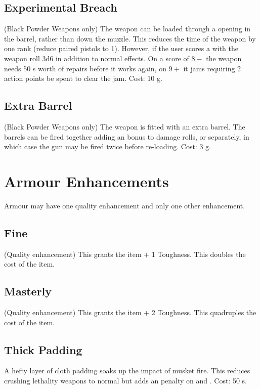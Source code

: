 \subsection{Experimental Breach}
(Black Powder Weapons only) The weapon can be loaded through a opening in the barrel, rather than down the muzzle. This reduces the  time of the weapon by one rank (reduce paired pistols to  1). However, if the user scores a  with the weapon roll 3d6 in addition to normal  effects. On a score of $8-$ the weapon needs 50 s worth of repairs before it works again, on $9+$ it jams requiring 2 action points be spent to clear the jam. Cost: 10 g.

\subsection{Extra Barrel}
(Black Powder Weapons only) The weapon is fitted with an extra barrel. The barrels can be fired together adding an  bonus to damage rolls, or separately, in which case the gun may be fired twice before re-loading. Cost: 3 g.




\section{Armour Enhancements}
Armour may have one quality enhancement and only one other enhancement.

\subsection{Fine}
(Quality enhancement) This grants the item + 1 Toughness. This doubles the cost of the item.

\subsection{Masterly}
(Quality enhancement) This grants the item + 2 Toughness. This quadruples the cost of the item.

\subsection{Thick Padding}
A hefty layer of cloth padding soaks up the impact of musket fire. This reduces crushing lethality  weapons to normal  but adds an  penalty on  and . Cost: 50 s.

